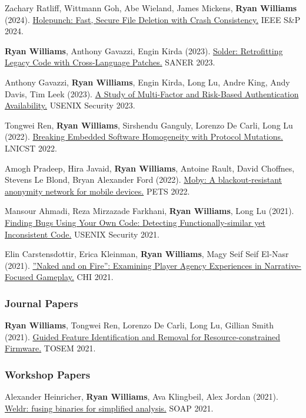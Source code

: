 \documentclass[11pt]{article}
\begin{document}
Zachary Ratliff, Wittmann Goh, Abe Wieland, James Mickens, \textbf{Ryan Williams} (2024).
\href{https://eprint.iacr.org/2023/1927}{Holepunch: Fast, Secure File Deletion with Crash Consistency.}
IEEE S&P 2024.

\textbf{Ryan Williams}, Anthony Gavazzi, Engin Kirda (2023).
\href{https://ieeexplore.ieee.org/abstract/document/10123487}{Solder: Retrofitting Legacy Code with Cross-Language Patches.}
SANER 2023.

Anthony Gavazzi, \textbf{Ryan Williams}, Engin Kirda, Long Lu, Andre King, Andy Davis, Tim Leek (2023).
\href{https://www.usenix.org/system/files/sec23summer_41-gavazzi-prepub.pdf}{A Study of Multi-Factor and Risk-Based Authentication Availability.}
USENIX Security 2023.

Tongwei Ren, \textbf{Ryan Williams}, Sirshendu Ganguly, Lorenzo De Carli, Long Lu (2022).
\href{https://link.springer.com/chapter/10.1007/978-3-031-25538-0_40}{Breaking Embedded Software Homogeneity with Protocol Mutations.}
LNICST 2022.

Amogh Pradeep, Hira Javaid, \textbf{Ryan Williams}, Antoine Rault, David Choffnes, Stevens Le Blond, Bryan Alexander Ford (2022).
\href{https://infoscience.epfl.ch/record/301155}{Moby: A blackout-resistant anonymity network for mobile devices.}
PETS 2022.

Mansour Ahmadi, Reza Mirzazade Farkhani, \textbf{Ryan Williams}, Long Lu (2021).
\href{https://www.usenix.org/system/files/sec21-ahmadi.pdf}{Finding Bugs Using Your Own Code: Detecting Functionally-similar yet Inconsistent Code.}
USENIX Security 2021.

Elin Carstensdottir, Erica Kleinman, \textbf{Ryan Williams}, Magy Seif Seif El-Nasr (2021).
\href{https://dl.acm.org/doi/abs/10.1145/3411764.3445540}{”Naked and on Fire”: Examining Player Agency Experiences in Narrative-Focused Gameplay.}
CHI 2021.

\subsubsection{Journal Papers}
\textbf{Ryan Williams}, Tongwei Ren, Lorenzo De Carli, Long Lu, Gillian Smith (2021).
\href{https://dl.acm.org/doi/full/10.1145/3487568}{Guided Feature Identification and Removal for Resource-constrained Firmware.}
TOSEM 2021.

\subsubsection{Workshop Papers}
Alexander Heinricher, \textbf{Ryan Williams}, Ava Klingbeil, Alex Jordan (2021).
\href{https://dl.acm.org/doi/abs/10.1145/3460946.3464320}{Weldr: fusing binaries for simplified analysis.}
SOAP 2021.
\end{document}
